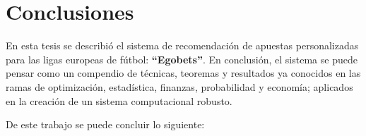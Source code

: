 %
\chapter{Conclusiones}

En esta tesis se describió el sistema de recomendación de apuestas personalizadas para las ligas europeas de fútbol: \textbf{``Egobets''}. En conclusión, el sistema se puede pensar como un compendio de técnicas, teoremas y resultados ya conocidos en las ramas de optimización, estadística, finanzas, probabilidad y economía; aplicados en la creación de un sistema computacional robusto.

De este trabajo se puede concluir lo siguiente:



